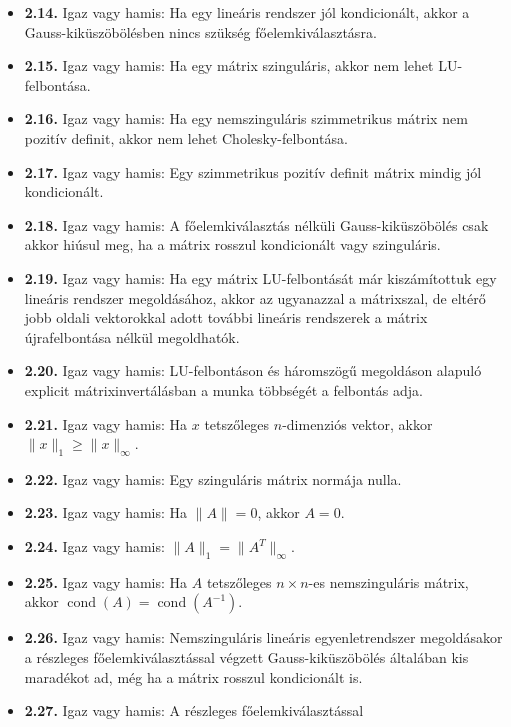 \documentclass[
  magyar,
  11pt]{article}
\begin{document}
\begin{itemize}
  \textbf{2.13.} Igaz vagy hamis: Ha sorcserék megengedettek, akkor az
  LU-felbontás mindig létezik, még szinguláris \(A\) mátrixra is.
\item
  \textbf{2.14.} Igaz vagy hamis: Ha egy lineáris rendszer jól
  kondicionált, akkor a Gauss-kiküszöbölésben nincs szükség
  főelemkiválasztásra.
\item
  \textbf{2.15.} Igaz vagy hamis: Ha egy mátrix szinguláris, akkor nem
  lehet LU-felbontása.
\item
  \textbf{2.16.} Igaz vagy hamis: Ha egy nemszinguláris szimmetrikus
  mátrix nem pozitív definit, akkor nem lehet Cholesky-felbontása.
\item
  \textbf{2.17.} Igaz vagy hamis: Egy szimmetrikus pozitív definit
  mátrix mindig jól kondicionált.
\item
  \textbf{2.18.} Igaz vagy hamis: A főelemkiválasztás nélküli
  Gauss-kiküszöbölés csak akkor hiúsul meg, ha a mátrix rosszul
  kondicionált vagy szinguláris.
\item
  \textbf{2.19.} Igaz vagy hamis: Ha egy mátrix LU-felbontását már
  kiszámítottuk egy lineáris rendszer megoldásához, akkor az ugyanazzal
  a mátrixszal, de eltérő jobb oldali vektorokkal adott további lineáris
  rendszerek a mátrix újrafelbontása nélkül megoldhatók.
\item
  \textbf{2.20.} Igaz vagy hamis: LU-felbontáson és háromszögű
  megoldáson alapuló explicit mátrixinvertálásban a munka többségét a
  felbontás adja.
\item
  \textbf{2.21.} Igaz vagy hamis: Ha \(x\) tetszőleges \(n\)-dimenziós
  vektor, akkor \(\|x\|_1 \ge \|x\|_\infty\).
\item
  \textbf{2.22.} Igaz vagy hamis: Egy szinguláris mátrix normája nulla.
\item
  \textbf{2.23.} Igaz vagy hamis: Ha \(\|A\| = 0\), akkor \(A = 0\).
\item
  \textbf{2.24.} Igaz vagy hamis: \(\|A\|_1 = \|A^T\|_\infty\).
\item
  \textbf{2.25.} Igaz vagy hamis: Ha \(A\) tetszőleges \(n \times n\)-es
  nemszinguláris mátrix, akkor
  \(\operatorname{cond}(A) = \operatorname{cond}(A^{-1})\).
\item
  \textbf{2.26.} Igaz vagy hamis: Nemszinguláris lineáris
  egyenletrendszer megoldásakor a részleges főelemkiválasztással végzett
  Gauss-kiküszöbölés általában kis maradékot ad, még ha a mátrix rosszul
  kondicionált is.
\item
  \textbf{2.27.} Igaz vagy hamis: A részleges főelemkiválasztással

\end{itemize}
\end{document}
